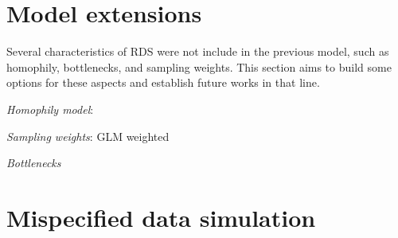 \section{Model extensions}

Several characteristics of RDS were not include in the previous model, such as
homophily, bottlenecks, and sampling weights. This section aims to build some
options for these aspects and establish future works in that line. 

\begin{alineas}
  \item {\em Homophily model}: \cite{yauck2021general} 
  \item {\em Sampling weights}: GLM weighted
  \item {\em Bottlenecks}
\end{alineas}

\section{Mispecified data simulation}

